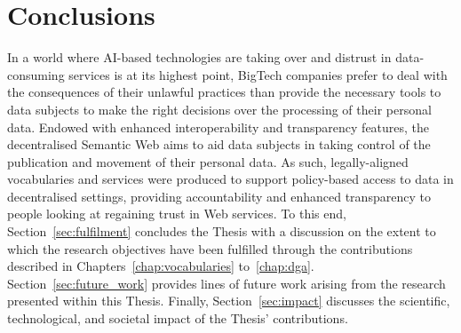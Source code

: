 \chapter{Conclusions}
\label{chap:conclusions}

In a world where AI-based technologies are taking over and distrust in data-consuming services is at its highest point, BigTech companies prefer to deal with the consequences of their unlawful practices than provide the necessary tools to data subjects to make the right decisions over the processing of their personal data.
Endowed with enhanced interoperability and transparency features, the decentralised Semantic Web aims to aid data subjects in taking control of the publication and movement of their personal data.
As such, legally-aligned vocabularies and services were produced to support policy-based access to data in decentralised settings, providing accountability and enhanced transparency to people looking at regaining trust in Web services. 
To this end, Section~\ref{sec:fulfilment} concludes the Thesis with a discussion on the extent to which the research objectives have been fulfilled through the contributions described in Chapters~\ref{chap:vocabularies} to~\ref{chap:dga}.
Section~\ref{sec:future_work} provides lines of future work arising from the research presented within this Thesis.
Finally, Section~\ref{sec:impact} discusses the scientific, technological, and societal impact of the Thesis' contributions.



